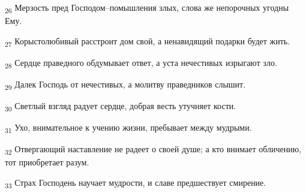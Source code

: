 \begin{tcolorbox}
\textsubscript{26} Мерзость пред Господом--помышления злых, слова же непорочных угодны Ему.
\end{tcolorbox}
\begin{tcolorbox}
\textsubscript{27} Корыстолюбивый расстроит дом свой, а ненавидящий подарки будет жить.
\end{tcolorbox}
\begin{tcolorbox}
\textsubscript{28} Сердце праведного обдумывает ответ, а уста нечестивых изрыгают зло.
\end{tcolorbox}
\begin{tcolorbox}
\textsubscript{29} Далек Господь от нечестивых, а молитву праведников слышит.
\end{tcolorbox}
\begin{tcolorbox}
\textsubscript{30} Светлый взгляд радует сердце, добрая весть утучняет кости.
\end{tcolorbox}
\begin{tcolorbox}
\textsubscript{31} Ухо, внимательное к учению жизни, пребывает между мудрыми.
\end{tcolorbox}
\begin{tcolorbox}
\textsubscript{32} Отвергающий наставление не радеет о своей душе; а кто внимает обличению, тот приобретает разум.
\end{tcolorbox}
\begin{tcolorbox}
\textsubscript{33} Страх Господень научает мудрости, и славе предшествует смирение.
\end{tcolorbox}
